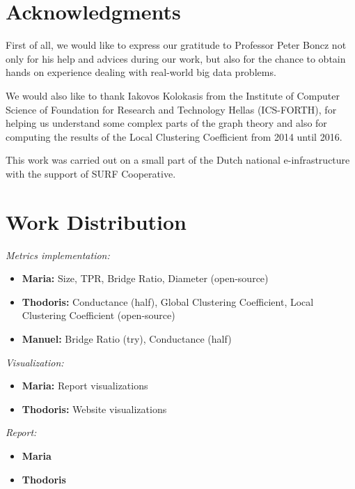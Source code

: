 \section{Acknowledgments}
First of all, we would like to express our gratitude to Professor Peter Boncz not only for his help and advices during our work,
but also for the chance to obtain hands on experience dealing with real-world big data problems.

We would also like to thank Iakovos Kolokasis from the Institute of Computer Science of Foundation for Research and Technology Hellas (ICS-FORTH),
for helping us understand some complex parts of the graph theory and also for computing the results of the Local Clustering Coefficient from 2014 until 2016.

This work was carried out on a small part of the Dutch national e-infrastructure with the support of SURF Cooperative.


\section{Work Distribution}
\textit{Metrics implementation:}
\begin{itemize}[noitemsep,topsep=0pt]
\item \textbf{Maria:} Size, TPR, Bridge Ratio, Diameter (open-source)
\vspace{1mm}
\item \textbf{Thodoris:} Conductance (half), Global Clustering Coefficient, Local Clustering Coefficient (open-source)
\vspace{1mm}
\item \textbf{Manuel:} Bridge Ratio (try), Conductance (half)
\end{itemize}
\vspace{2.5mm}
\textit{Visualization:}
\begin{itemize}[noitemsep,topsep=0pt]
\item \textbf{Maria:} Report visualizations
\item \textbf{Thodoris:} Website visualizations
\end{itemize}
\vspace{2.5mm}
\textit{Report:}
\begin{itemize}[noitemsep,topsep=0pt]
  \item \textbf{Maria}
  \item \textbf{Thodoris}
\end{itemize}
